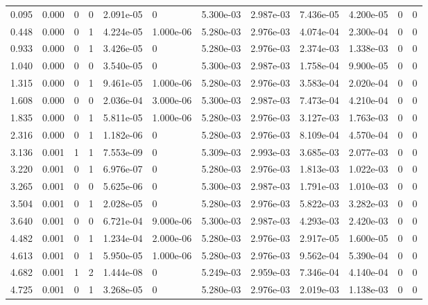 \documentclass[preview]{standalone}
\begin{document}
{{\begin{tabular}{L{1.2cm}C{1.2cm} C{0.3cm}C{0.5cm} C{1.4cm}C{1.4cm} C{1.4cm}C{1.4cm} C{1.6cm}C{1.6cm} C{1.6cm}C{1.6cm}}
  0.095  &  0.000  & 0     &  0 &  2.091e-05  & 0  &  5.300e-03&   2.987e-03& 7.436e-05 & 4.200e-05   &  0 & 0  \\ 
  0.448  &  0.000  & 0     &  1 &  4.224e-05  & 1.000e-06  &  5.280e-03&   2.976e-03& 4.074e-04 & 2.300e-04   &  0 & 0  \\ 
  0.933  &  0.000  & 0     &  1 &  3.426e-05  & 0  &  5.280e-03&   2.976e-03& 2.374e-03 & 1.338e-03   &  0 & 0  \\ 
  1.040  &  0.000  & 0     &  0 &  3.540e-05  & 0  &  5.300e-03&   2.987e-03& 1.758e-04 & 9.900e-05   &  0 & 0  \\ 
  1.315  &  0.000  & 0     &  1 &  9.461e-05  & 1.000e-06  &  5.280e-03&   2.976e-03& 3.583e-04 & 2.020e-04   &  0 & 0  \\ 
  1.608  &  0.000  & 0     &  0 &  2.036e-04  & 3.000e-06  &  5.300e-03&   2.987e-03& 7.473e-04 & 4.210e-04   &  0 & 0  \\ 
  1.835  &  0.000  & 0     &  1 &  5.811e-05  & 1.000e-06  &  5.280e-03&   2.976e-03& 3.127e-03 & 1.763e-03   &  0 & 0  \\ 
  2.316  &  0.000  & 0     &  1 &  1.182e-06  & 0  &  5.280e-03&   2.976e-03& 8.109e-04 & 4.570e-04   &  0 & 0  \\ 
  3.136  &  0.001  & 1     &  1 &  7.553e-09  & 0  &  5.309e-03&   2.993e-03& 3.685e-03 & 2.077e-03   &  0 & 0  \\ 
  3.220  &  0.001  & 0     &  1 &  6.976e-07  & 0  &  5.280e-03&   2.976e-03& 1.813e-03 & 1.022e-03   &  0 & 0  \\ 
  3.265  &  0.001  & 0     &  0 &  5.625e-06  & 0  &  5.300e-03&   2.987e-03& 1.791e-03 & 1.010e-03   &  0 & 0  \\ 
  3.504  &  0.001  & 0     &  1 &  2.028e-05  & 0  &  5.280e-03&   2.976e-03& 5.822e-03 & 3.282e-03   &  0 & 0  \\ 
  3.640  &  0.001  & 0     &  0 &  6.721e-04  & 9.000e-06  &  5.300e-03&   2.987e-03& 4.293e-03 & 2.420e-03   &  0 & 0  \\ 
  4.482  &  0.001  & 0     &  1 &  1.234e-04  & 2.000e-06  &  5.280e-03&   2.976e-03& 2.917e-05 & 1.600e-05   &  0 & 0  \\ 
  4.613  &  0.001  & 0     &  1 &  5.950e-05  & 1.000e-06  &  5.280e-03&   2.976e-03& 9.562e-04 & 5.390e-04   &  0 & 0  \\ 
  4.682  &  0.001  & 1     &  2 &  1.444e-08  & 0  &  5.249e-03&   2.959e-03& 7.346e-04 & 4.140e-04   &  0 & 0  \\ 
  4.725  &  0.001  & 0     &  1 &  3.268e-05  & 0  &  5.280e-03&   2.976e-03& 2.019e-03 & 1.138e-03   &  0 & 0  \\ 

\end{tabular}}}
\end{document}
